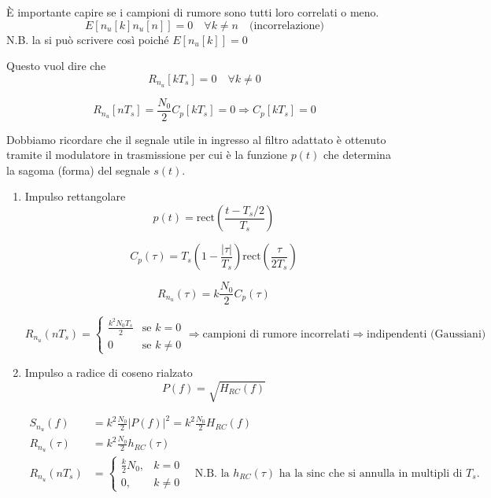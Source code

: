 È importante capire se i campioni di rumore sono tutti loro correlati o meno.
\[
E[n_u[k]n_u[n]] = 0 \quad \forall k \neq n \quad \text{(incorrelazione)}
\]
N.B. la si può scrivere così poiché
\(E[n_u[k]] = 0\)

Questo vuol dire che
\[
R_{n_u}[kT_s] = 0 \quad \forall k \neq 0
\]

\[
R_{n_u}[nT_s] = \frac{N_0}{2} C_p[kT_s] = 0 \Rightarrow C_p[kT_s] = 0
\]


Dobbiamo ricordare che il segnale utile in ingresso al filtro adattato è ottenuto tramite il modulatore in trasmissione per cui è la funzione \( p(t) \) che determina la sagoma (forma) del segnale \( s(t) \).

\begin{enumerate}
  \item Impulso rettangolare
  \[
  p(t) = \text{rect}\left(\frac{t-T_s/2}{T_s}\right)
  \]

  \[
  C_p(\tau) = T_s \left(1 - \frac{|\tau|}{T_s}\right) \text{rect}\left(\frac{\tau}{2T_s}\right)
  \]

  \[
  R_{n_u}(\tau) = k \frac{N_0}{2} C_p(\tau)
  \]

  \[
  R_{n_u}(nT_s) =
  \begin{cases}
    \frac{k^2 N_0 T_s}{2} & \text{se } k = 0\\
    0 & \text{se } k \neq 0
  \end{cases}
  \Rightarrow
  \text{campioni di rumore incorrelati} \Rightarrow \text{indipendenti (Gaussiani)}
  \]
  \begin{center}
   
  \end{center}
  \item Impulso a radice di coseno rialzato
  \[
  P(f) = \sqrt{H_{RC}(f)}
  \]
  
    \begin{align*}
    S_{n_u}(f) &= k^2 \frac{N_0}{2} |P(f)|^2 = k^2 \frac{N_0}{2} H_{RC}(f) \\
    R_{n_u}(\tau) &= k^2 \frac{N_0}{2} h_{RC}(\tau) \\
    R_{n_u}(nT_s) &= \begin{cases}
    \frac{k}{2} N_0, & k = 0 \\
    0, & k \neq 0
    \end{cases} \quad
    \text{N.B. la $h_{RC}(\tau)$ ha la sinc che si annulla in multipli di $T_s$.}
    \end{align*}
    
\end{enumerate}



